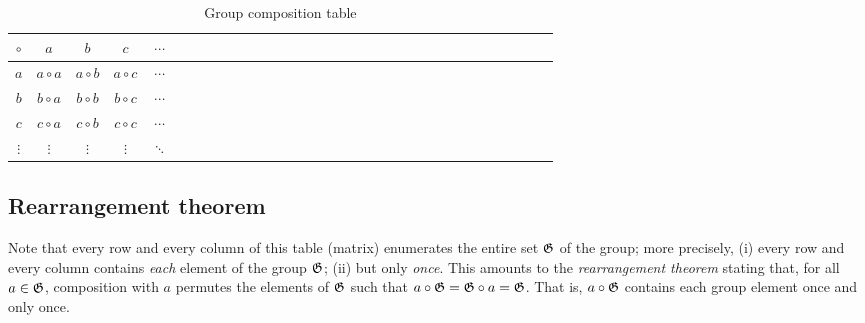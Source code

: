 \begin{table}
\begin{center}
\begin{tabular}{c|ccccccccccccccccccccccccccccccc}
$\circ$&$a$&$b$&$c$&$\cdots$\\
\hline
$a$&$a \circ a$&$a \circ b$&$a \circ c$&$\cdots$\\
$b$&$b \circ a$&$b \circ b$&$b \circ c$&$\cdots$  \\
$c$&$c \circ a$&$c \circ b$&$c \circ c$&$\cdots$    \\
$\vdots$&$\vdots$&$\vdots$&$\vdots$&$\ddots$
\end{tabular}
\caption{Group composition table\label{2017-m-ch-gt-t-gct}}
\end{center}
\end{table}

\subsection{Rearrangement theorem}
\label{2019-mm-ch-gt-rt}

Note that every row and every column of this table (matrix) enumerates the entire set ${\frak G}$ of the group;
more precisely, (i)  every row and every column
contains {\em each} element of the group ${\frak G}$;
(ii) but only  {\em once}.
This amounts to the {\em rearrangement theorem}
stating that, for all $a \in  {\frak G}$, composition with $a$ permutes the elements of ${\frak G}$ such that
$a \circ {\frak G} =  {\frak G} \circ a = {\frak G}$.
That is, $a \circ {\frak G}$ contains each group element once and only once.

